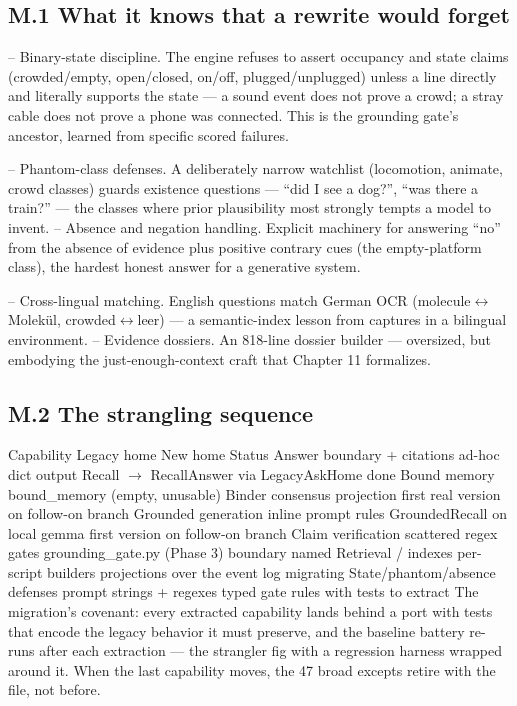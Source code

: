 \subsection{M.1 What it knows that a rewrite would forget}\label{m.1-what-it-knows-that-a-rewrite-would-forget}

-- Binary-state discipline. The engine refuses to assert occupancy and state claims (crowded/empty, open/closed, on/off, plugged/unplugged) unless a line directly and literally supports the state --- a sound event does not prove a crowd; a stray cable does not prove a phone was connected. This is the grounding gate's ancestor, learned from specific scored failures.

-- Phantom-class defenses. A deliberately narrow watchlist (locomotion, animate, crowd classes) guards existence questions --- ``did I see a dog?'', ``was there a train?'' --- the classes where prior plausibility most strongly tempts a model to invent. -- Absence and negation handling. Explicit machinery for answering ``no'' from the absence of evidence plus positive contrary cues (the empty-platform class), the hardest honest answer for a generative system.

-- Cross-lingual matching. English questions match German OCR (molecule\(\leftrightarrow\)Molekül, crowded\(\leftrightarrow\)leer) --- a semantic-index lesson from captures in a bilingual environment. -- Evidence dossiers. An 818-line dossier builder --- oversized, but embodying the just-enough-context craft that Chapter 11 formalizes.

\subsection{M.2 The strangling sequence}\label{m.2-the-strangling-sequence}

Capability Legacy home New home Status Answer boundary + citations ad-hoc dict output Recall \(\rightarrow\) RecallAnswer via LegacyAskHome done Bound memory bound\_memory (empty, unusable) Binder consensus projection first real version on follow-on branch Grounded generation inline prompt rules GroundedRecall on local gemma first version on follow-on branch Claim verification scattered regex gates grounding\_gate.py (Phase 3) boundary named Retrieval / indexes per-script builders projections over the event log migrating State/phantom/absence defenses prompt strings + regexes typed gate rules with tests to extract The migration's covenant: every extracted capability lands behind a port with tests that encode the legacy behavior it must preserve, and the baseline battery re-runs after each extraction --- the strangler fig with a regression harness wrapped around it. When the last capability moves, the 47 broad excepts retire with the file, not before.


